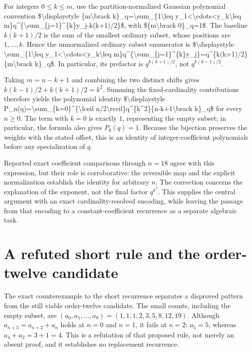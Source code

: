 \documentclass[11pt]{article}
\begin{document}
For integers $0\leq k\leq m$, use the partition-normalized Gaussian polynomial convention \$\textbackslash{}displaystyle \{m\textbackslash{}brack k\}\_q=\textbackslash{}sum\_\{1\textbackslash{}leq y\_1\textless{}\textbackslash{}cdots\textless{}y\_k\textbackslash{}leq m\}q\textasciicircum{}\{\textbackslash{}sum\_\{j=1\}\textasciicircum{}\{k\}y\_j-k(k+1)/2\}\$, with \$\{m\textbackslash{}brack 0\}\_q=1\$. The baseline $k(k+1)/2$ is the sum of the smallest ordinary subset, whose positions are $1,\ldots,k$. Hence the unnormalized ordinary subset enumerator is \$\textbackslash{}displaystyle \textbackslash{}sum\_\{1\textbackslash{}leq y\_1\textless{}\textbackslash{}cdots\textless{}y\_k\textbackslash{}leq m\}q\textasciicircum{}\{\textbackslash{}sum\_\{j=1\}\textasciicircum{}\{k\}y\_j\}=q\textasciicircum{}\{k(k+1)/2\}\{m\textbackslash{}brack k\}\_q\$. In particular, its prefactor is $q^{k(k+1)/2}$, not $q^{k(k-1)/2}$.

Taking $m=n-k+1$ and combining the two distinct shifts gives $k(k-1)/2+k(k+1)/2=k^2$. Summing the fixed-cardinality contributions therefore yields the polynomial identity \$\textbackslash{}displaystyle P\_n(q)=\textbackslash{}sum\_\{k=0\}\textasciicircum{}\{\textbackslash{}lceil n/2\textbackslash{}rceil\}q\textasciicircum{}\{k\textasciicircum{}2\}\{n-k+1\textbackslash{}brack k\}\_q\$ for every $n\geq 0$. The term with $k=0$ is exactly $1$, representing the empty subset; in particular, the formula also gives $P_0(q)=1$. Because the bijection preserves the weights with the stated offset, this is an identity of integer-coefficient polynomials before any specialization of $q$.

Reported exact coefficient comparisons through $n=18$ agree with this expression, but their role is corroborative: the reversible map and the explicit normalization establish the identity for arbitrary $n$. The correction concerns the explanation of the exponent, not the final factor $q^{k^2}$. This supplies the central argument with an exact cardinality-resolved encoding, while leaving the passage from that encoding to a constant-coefficient recurrence as a separate algebraic task.

\section{A refuted short rule and the order-twelve candidate}
The exact counterexample to the short recurrence separates a disproved pattern from the still viable order-twelve candidate. The small counts, including the empty subset, are $(a_0,a_1,\ldots,a_8)=(1,1,1,2,3,5,8,12,19)$. Although $a_{n+3}=a_{n+2}+a_n$ holds at $n=0$ and $n=1$, it fails at $n=2$: $a_5=5$, whereas $a_4+a_2=3+1=4$. This is a refutation of that proposed rule, not merely an absent proof, and it establishes no replacement recurrence.
\end{document}
